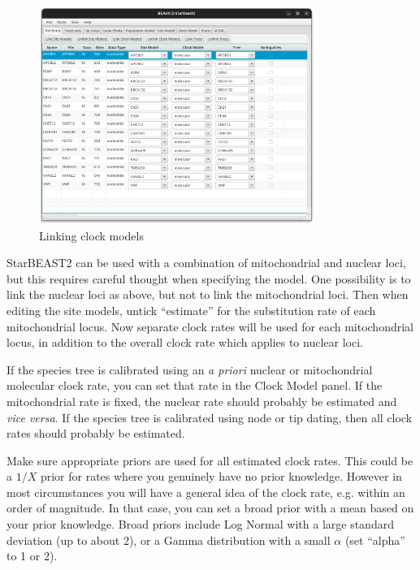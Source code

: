 \documentclass[12pt]{article}
\begin{document}
\begin{figure}[htb!]
\centering
\includegraphics[width=0.8\textwidth]{figures/linkModels.png}
\caption
{Linking clock models}
\label{fig:linkModels}
\end{figure}{}

\begin{tcolorbox}[colback=green!5,colframe=green!40!black,title=Mixing nuclear and mitochondrial loci]
StarBEAST2 can be used with a combination of mitochondrial and nuclear loci, but this requires careful thought when specifying the model. One possibility is to link the nuclear loci as above, but not to link the mitochondrial loci. Then when editing the site models, untick ``estimate'' for the substitution rate of each mitochondrial locus. Now separate clock rates will be used for each mitochondrial locus, in addition to the overall clock rate which applies to nuclear loci.

If the species tree is calibrated using an \textit{a priori} nuclear or mitochondrial molecular clock rate, you can set that rate in the Clock Model panel. If the mitochondrial rate is fixed, the nuclear rate should probably be estimated and \textit{vice versa}. If the species tree is calibrated using node or tip dating, then all clock rates should probably be estimated.

Make sure appropriate priors are used for all estimated clock rates. This could be a $1/X$ prior for rates where you genuinely have no prior knowledge. However in most circumstances you will have a general idea of the clock rate, e.g. within an order of magnitude. In that case, you can set a broad prior with a mean based on your prior knowledge. Broad priors include Log Normal with a large standard deviation (up to about 2), or a Gamma distribution with a small $\alpha$ (set ``alpha'' to 1 or 2).
\end{tcolorbox}
\end{document}
